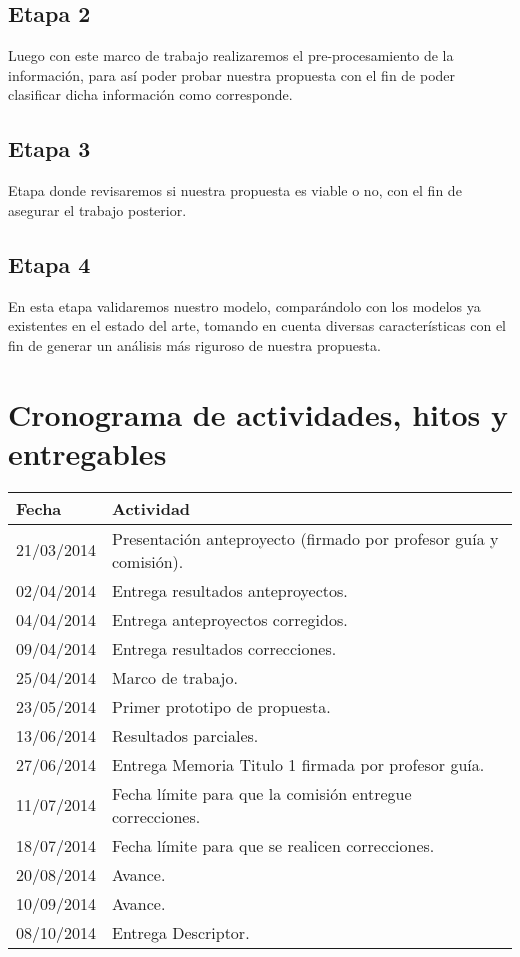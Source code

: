 \documentclass{udparticle}
\begin{document}
\subsection{Etapa 2}
Luego con este marco de trabajo realizaremos el pre-procesamiento de la información, para así poder probar nuestra propuesta con el fin de poder clasificar dicha información como corresponde.
\subsection{Etapa 3}
Etapa donde revisaremos si nuestra propuesta es viable o no, con el fin de asegurar el trabajo posterior.
\subsection{Etapa 4}
En esta etapa validaremos nuestro modelo, comparándolo con los modelos ya existentes en el estado del arte, tomando en cuenta diversas características con el fin de generar un análisis más riguroso de nuestra propuesta.


\section{Cronograma de actividades, hitos y entregables}
\begin{tabular}{ll}
\hline\noalign{\smallskip}
Fecha & Actividad \\
\hline\noalign{\smallskip}
21/03/2014 & Presentación anteproyecto (firmado por profesor guía y comisión).\\

02/04/2014 & Entrega resultados anteproyectos.\\

04/04/2014 & Entrega anteproyectos corregidos.\\

09/04/2014 &  Entrega resultados correcciones.\\

25/04/2014 & Marco de trabajo.\\

23/05/2014 & Primer prototipo de propuesta.\\

13/06/2014 & Resultados parciales.\\

27/06/2014 & Entrega Memoria Titulo 1 firmada por profesor guía.\\

11/07/2014 & Fecha límite para que la comisión entregue correcciones.\\

18/07/2014 & Fecha límite para que se realicen correcciones.\\

20/08/2014 & Avance.\\

10/09/2014 & Avance.\\

08/10/2014 & Entrega Descriptor.\\


\hline

\end{tabular}
\end{document}
